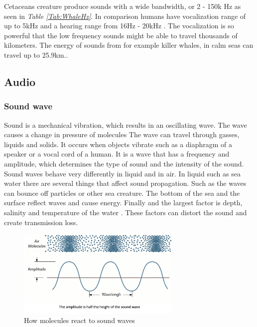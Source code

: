 Cetaceans creature produce sounds with a wide bandwidth, or 2 - 150k Hz as seen in \textit{Table \ref{Tab:WhaleHz}}.
In comparison humans have vocalization range of up to 5kHz and a hearing range from 16Hz - 20kHz \cite{monson_perceptual_2014}.
The vocalization is so powerful that the low frequency sounds might be able to travel thousands of kilometers\cite{nowacek_studying_2016}.
The energy of sounds from for example killer whales, in calm seas can travel up to 25.9km.\cite{miller_diversity_2006}.

\newpage

\subsection{Audio}

\subsubsection{Sound wave}

Sound is a mechanical vibration, which results in an oscillating wave.
The wave causes a change in pressure of molecules 
The wave can travel through gasses, liquids and solids.
It occurs when objects vibrate such as a diaphragm of a speaker or a vocal cord of a human.
It is a wave that has a frequency and amplitude, which determines the type of sound and the intensity of the sound.
Sound waves behave very differently in liquid and in air.
In liquid such as sea water there are several things that affect sound propagation.
Such as the waves can bounce off particles or other sea creature. 
The bottom of the sea and the surface reflect waves and cause energy.
Finally and the largest factor  is depth, salinity and temperature of the water .
These factors can distort the sound and create transmission loss\cite{noauthor_sonar_nodate}.


\begin{figure}[h]
    \centering
    \includegraphics[width=0.70\textwidth]{graphics/soundwaves.png}
    \caption{How molecules react to sound waves \cite{noauthor_what_nodate}}
    \label{fig:SoundWaves}
\end{figure}

